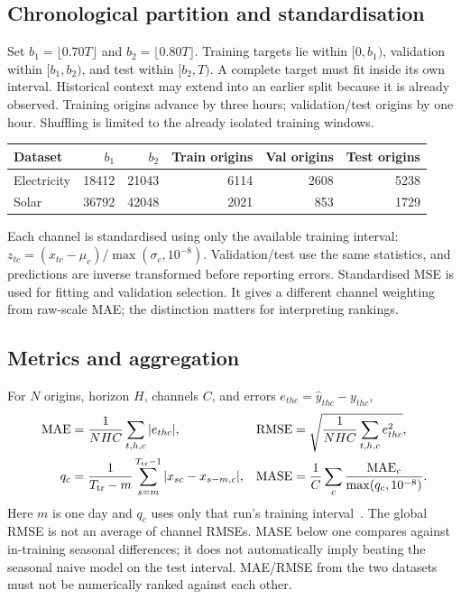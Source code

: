 \documentclass[10pt,a4paper]{article}
\begin{document}
\subsection{Chronological partition and standardisation}
Set $b_1=\lfloor0.70T\rfloor$ and $b_2=\lfloor0.80T\rfloor$. Training targets lie within $[0,b_1)$, validation within $[b_1,b_2)$, and test within $[b_2,T)$. A complete target must fit inside its own interval. Historical context may extend into an earlier split because it is already observed. Training origins advance by three hours; validation/test origins by one hour. Shuffling is limited to the already isolated training windows.
\begin{center}\small
\begin{tabular}{lrrrrr}\toprule
Dataset & $b_1$ & $b_2$ & Train origins & Val origins & Test origins\\\midrule
Electricity & 18412 & 21043 & 6114 & 2608 & 5238\\
Solar & 36792 & 42048 & 2021 & 853 & 1729\\
\bottomrule\end{tabular}\end{center}

Each channel is standardised using only the available training interval: $z_{tc}=(x_{tc}-\mu_c)/\max(\sigma_c,10^{-8})$. Validation/test use the same statistics, and predictions are inverse transformed before reporting errors. Standardised MSE is used for fitting and validation selection. It gives a different channel weighting from raw-scale MAE; the distinction matters for interpreting rankings.
\subsection{Metrics and aggregation}
For $N$ origins, horizon $H$, channels $C$, and errors $e_{thc}=\hat y_{thc}-y_{thc}$,
\begin{align}
\mathrm{MAE}&=\frac1{NHC}\sum_{t,h,c}|e_{thc}|,&
\mathrm{RMSE}&=\sqrt{\frac1{NHC}\sum_{t,h,c}e_{thc}^2},\\
q_c&=\frac1{T_{\rm tr}-m}\sum_{s=m}^{T_{\rm tr}-1}|x_{sc}-x_{s-m,c}|,&
\mathrm{MASE}&=\frac1C\sum_c\frac{\mathrm{MAE}_c}{\max(q_c,10^{-8})}.
\end{align}
Here $m$ is one day and $q_c$ uses only that run's training interval~\cite{mase}. The global RMSE is not an average of channel RMSEs. MASE below one compares against in-training seasonal differences; it does not automatically imply beating the seasonal naive model on the test interval. MAE/RMSE from the two datasets must not be numerically ranked against each other.
\end{document}
